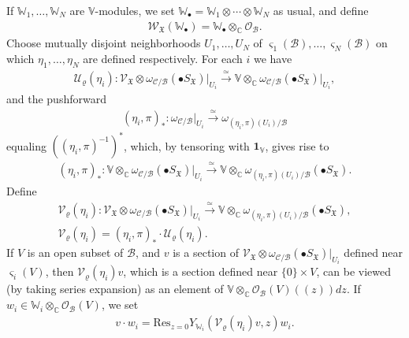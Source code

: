 \documentclass[12pt,a4paper,notitlepage]{report}
\theoremstyle{definition}
\theoremstyle{plain}
\newcommand{\fk}{\mathfrak}
\newcommand{\mc}{\mathcal}
\newcommand{\id}{\mathbf{1}}
\newcommand{\Res}{\mathrm{Res}}
\newcommand{\scr}{\mathscr}
\newcommand{\sgm}{\varsigma}
\newcommand{\blt}{\bullet}
\newcommand{\Vbb}{\mathbb V}
\newcommand{\Wbb}{\mathbb W}
\newcommand{\Cbb}{\mathbb C}
\numberwithin{equation}{section}
\begin{document}
If $\Wbb_1,\dots,\Wbb_N$ are $\Vbb$-modules, we set $\Wbb_\blt=\Wbb_1\otimes \cdots\otimes \Wbb_N$ as usual, and define
\begin{align}
\scr W_{\fk X}(\Wbb_\blt)=\Wbb_\blt\otimes_{\Cbb}\scr O_{\mc B}.
\end{align}
Choose mutually disjoint neighborhoods $U_1,\dots,U_N$ of $\sgm_1(\mc B),\dots,\sgm_N(\mc B)$ on which $\eta_1,\dots,\eta_N$ are defined respectively. For each $i$ we have
\begin{gather*}
\mc U_\varrho(\eta_i):\scr V_{\fk X}\otimes\omega_{\mc C/\mc B}(\blt S_{\fk X})\big|_{U_i}\xrightarrow{\simeq}\Vbb\otimes_{\Cbb}\omega_{\mc C/\mc B}(\blt S_{\fk X})\big|_{U_i},
\end{gather*}
and the  pushforward
\begin{gather*}
(\eta_i,\pi)_*:\omega_{\mc C/\mc B}\big|_{U_i}\xrightarrow{\simeq}\omega_{(\eta_i,\pi)(U_i)/\mc B}
\end{gather*}
equaling $((\eta_i,\pi)^{-1})^*$, which, by tensoring with $\id_\Vbb$, gives rise to
\begin{gather*}
(\eta_i,\pi)_*:\Vbb\otimes_{\Cbb}\omega_{\mc C/\mc B}(\blt S_{\fk X})\big|_{U_i}\xrightarrow{\simeq}\Vbb\otimes_{\Cbb}\omega_{(\eta_i,\pi)(U_i)/\mc B}(\blt S_{\fk X}).
\end{gather*}
Define \index{UV@$\mc U_\varrho(\eta),\mc U_\varrho(\varphi),\mc V_\varrho(\eta),\mc V_\varrho(\varphi)$}
\begin{gather}
\mc V_\varrho(\eta_i):\scr V_{\fk X}\otimes\omega_{\mc C/\mc B}(\blt S_{\fk X})\big|_{U_i}\xrightarrow{\simeq}\Vbb\otimes_{\Cbb}\omega_{(\eta_i,\pi)(U_i)/\mc B}(\blt S_{\fk X}),\nonumber\\
\mc V_{\varrho}(\eta_i)=(\eta_i,\pi)_*\cdot \mc U_{\varrho}(\eta_i).
\end{gather}
If $V$ is an open subset of $\mc B$, and $v$ is a section of $\scr V_{\fk X}\otimes\omega_{\mc C/\mc B}(\blt S_{\fk X})\big|_{U_i}$ defined near $\sgm_i(V)$, then $\mc V_\varrho(\eta_i)v$, which is a section defined near $\{0\}\times V$, can be viewed (by taking series expansion) as an element of $\Vbb\otimes_\Cbb\scr O_{\mc B}(V)((z))dz$. If $w_i\in\Wbb_i\otimes_\Cbb\scr O_{\mc B}(V)$, we set \index{vw@$v\cdot w_i,v\cdot w_\blt$}
\begin{align}
v\cdot w_i=\Res_{z=0}Y_{\Wbb_i}(\mc V_\varrho(\eta_i)v,z)w_i.\label{eq116}
\end{align}
\end{document}
